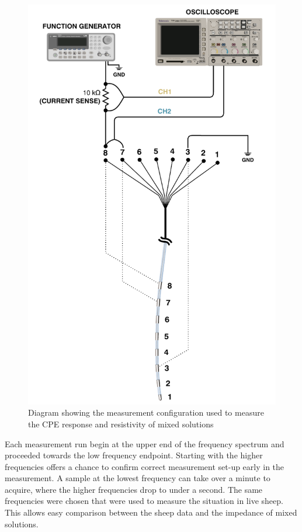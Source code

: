   \begin{figure}
      \centering
      \includegraphics[scale=0.95]{content/pt2/graphics/CreatingCSF_setup}
      \caption{\label{fig:creatingCSF_setup}Diagram showing the measurement configuration used to measure the CPE response and resistivity of mixed solutions}
  \end{figure}

  Each measurement run begin at the upper end of the frequency spectrum and proceeded towards the low frequency endpoint.
  Starting with the higher frequencies offers a chance to confirm correct measurement set-up early in the measurement.
  A sample at the lowest frequency can take over a minute to acquire, where the higher frequencies drop to under a second.
  The same frequencies were chosen that were used to measure the situation in live sheep.
  This allows easy comparison between the sheep data and the impedance of mixed solutions.
  
